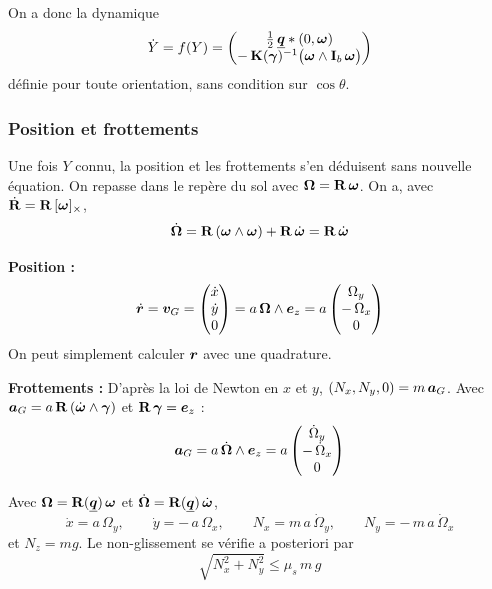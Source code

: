 On a donc la dynamique
\[
    \dot Y = f(Y)= \begin{pmatrix}
        \tfrac12\,\underline{\bm{q}}\ast(0,\bm{\omega})\\
        -\,\mathbf{K}(\bm{\gamma})^{-1}
        \bigl(\bm{\omega}\wedge\mathbf{I}_b\,\bm{\omega}\bigr)
    \end{pmatrix}
\]
définie pour toute orientation, sans condition sur $\cos\theta$.

\subsubsection{Position et frottements}

Une fois $Y$ connu, la position et les frottements s'en déduisent sans
nouvelle équation. On repasse dans le repère du sol avec
$\bm{\Omega} = \mathbf{R}\,\bm{\omega}$. On a, avec
$\dot{\mathbf{R}} = \mathbf{R}\,[\bm{\omega}]_{\times}$,
\[
    \dot{\bm{\Omega}} = \mathbf{R}\,(\bm{\omega}\wedge\bm{\omega})
    + \mathbf{R}\,\dot{\bm{\omega}}
    = \mathbf{R}\,\dot{\bm{\omega}}
\]

\textbf{Position : }
\[
    \dot{\bm{r}} = \bm{v}_G = \begin{pmatrix}
        \dot x\\ \dot y\\ 0
    \end{pmatrix}
    = a\,\bm{\Omega}\wedge\bm{e}_z
    = a\begin{pmatrix}
        \Omega_y\\ -\,\Omega_x\\ 0
    \end{pmatrix}
\]
On peut simplement calculer $\bm{r}$ avec une quadrature. 

\textbf{Frottements : } D'après la loi de Newton en $x$ et $y$,
$(N_x, N_y, 0) = m\,\bm{a}_G$. Avec
$\bm{a}_G = a\,\mathbf{R}\,(\dot{\bm{\omega}}\wedge\bm{\gamma})$ et
$\mathbf{R}\,\bm{\gamma} = \bm{e}_z$ : 
\[
    \bm{a}_G = a\,\dot{\bm{\Omega}}\wedge\bm{e}_z
    = a\begin{pmatrix}
        \dot\Omega_y\\ -\,\dot\Omega_x\\ 0
    \end{pmatrix}
\]

\begin{proposition}
    Avec $\bm{\Omega} = \mathbf{R}(\underline{\bm{q}})\,\bm{\omega}$ et
    $\dot{\bm{\Omega}} = \mathbf{R}(\underline{\bm{q}})\,\dot{\bm{\omega}}$,
    \[
        \dot x = a\,\Omega_y,
        \qquad
        \dot y = -\,a\,\Omega_x,
        \qquad
        N_x = m\,a\,\dot\Omega_y,
        \qquad
        N_y = -\,m\,a\,\dot\Omega_x
    \]
    et $N_z = m g$. Le non-glissement se vérifie a posteriori par
    \[
        \sqrt{N_x^2 + N_y^2} \leq \mu_s\,m\,g
    \]
\end{proposition}


